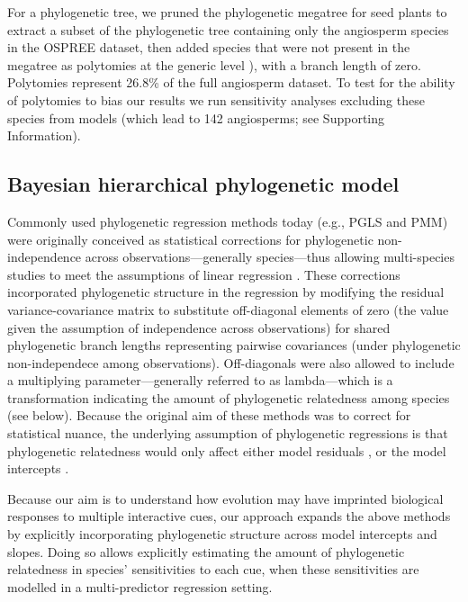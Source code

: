 \documentclass[11pt]{article}
\begin{document}
For a phylogenetic tree, we pruned  the phylogenetic megatree for seed plants \citep{smith2018constructing} to extract a subset of the phylogenetic tree containing only the angiosperm species in the OSPREE dataset, then added species that were not present in the megatree as polytomies at the generic level \citep[using the function `congeneric.merge' in][]{pearse2015pez}), with a branch length of zero. Polytomies represent 26.8\% of the full angiosperm dataset. To test for the ability of polytomies to bias our results we run sensitivity analyses excluding these species from models (which lead to 142 angiosperms; see Supporting Information). \\ 

\subsection*{Bayesian hierarchical phylogenetic model}
Commonly used phylogenetic regression methods today (e.g., PGLS and PMM) were originally conceived as statistical corrections for phylogenetic non-independence across observations---generally species---thus allowing multi-species studies to meet the assumptions of linear regression \citep{freckleton2002phylogenetic}. These corrections incorporated phylogenetic structure in the regression by modifying the residual variance-covariance matrix to substitute off-diagonal elements of zero (the value given the assumption of independence across observations) for shared phylogenetic branch lengths representing pairwise covariances (under phylogenetic non-independece among observations). Off-diagonals were also allowed to include a multiplying parameter---generally referred to as lambda---which is a transformation indicating the amount of phylogenetic relatedness among species (see below). Because the original aim of these methods was to correct for statistical nuance, the underlying assumption of phylogenetic regressions is that phylogenetic relatedness would only affect either model residuals \citep[in PGLS approaches,][]{freckleton2002phylogenetic}, or the model intercepts \citep[e.g., in many PMM approaches,][]{housworth2004phylogenetic}.

Because our aim is to understand how evolution may have imprinted biological responses to multiple interactive cues, our approach expands the above methods by explicitly incorporating phylogenetic structure across model intercepts and slopes. Doing so allows explicitly estimating the amount of phylogenetic relatedness in species' sensitivities to each cue, when these sensitivities are modelled in a multi-predictor regression setting.  
\end{document}
